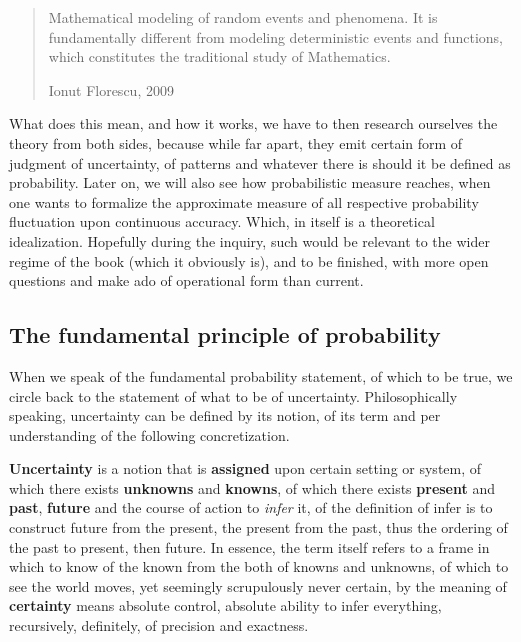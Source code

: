 \blockquote[Ionut Florescu, 2009]{Mathematical modeling of random events and phenomena. It is fundamentally different from modeling deterministic events and functions, which constitutes the traditional study of Mathematics.}

What does this mean, and how it works, we have to then research ourselves the theory from both sides, because while far apart, they emit certain form of judgment of uncertainty, of patterns and whatever there is should it be defined as probability. Later on, we will also see how probabilistic measure reaches, when one wants to formalize the approximate measure of all respective probability fluctuation upon continuous accuracy. Which, in itself is a theoretical idealization. Hopefully during the inquiry, such would be relevant to the wider regime of the book (which it obviously is), and to be finished, with more open questions and make ado of operational form than current. 

\subsection{The fundamental principle of probability}

When we speak of the fundamental probability statement, of which to be true, we circle back to the statement of what to be of uncertainty. Philosophically speaking, uncertainty can be defined by its notion, of its term and per understanding of the following concretization.

\begin{definition}
    \textbf{Uncertainty} is a notion that is \textbf{assigned} upon certain setting or system, of which there exists \textbf{unknowns} and \textbf{knowns}, of which there exists \textbf{present} and \textbf{past}, \textbf{future} and the course of action to \textit{infer} it, of the definition of infer is to construct future from the present, the present from the past, thus the ordering of the past to present, then future. In essence, the term itself refers to a frame in which to know of the known from the both of knowns and unknowns, of which to see the world moves, yet seemingly scrupulously never certain, by the meaning of \textbf{certainty} means absolute control, absolute ability to infer everything, recursively, definitely, of precision and exactness. 
\end{definition}

